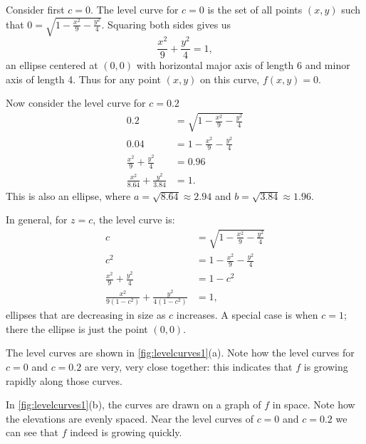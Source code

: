 {Consider first $c=0$. The level curve for $c=0$ is the set of all points $(x,y)$ such that $0=\sqrt{1-\frac{x^2}9-\frac{y^2}4}$. Squaring both sides  gives us
$$\frac{x^2}9+\frac{y^2}4=1,$$ an ellipse centered at $(0,0)$ with horizontal major axis of length 6 and minor axis of length 4. Thus for any point $(x,y)$ on this curve, $f(x,y) = 0$.

Now consider the level curve for $c=0.2$
\begin{align*}
0.2 &= \sqrt{1-\frac{x^2}9-\frac{y^2}4}\\
0.04 &= 1-\frac{x^2}9-\frac{y^2}4\\
\frac{x^2}9+\frac{y^2}4 &=0.96\\
\frac{x^2}{8.64}+\frac{y^2}{3.84} &=1.
\end{align*}
This is also an ellipse, where $a = \sqrt{8.64}\approx 2.94$ and $b=\sqrt{3.84}\approx 1.96$.

In general, for $z=c$, the level curve is:
\begin{align*}
c &= \sqrt{1-\frac{x^2}9-\frac{y^2}4}\\
c^2 &= 1-\frac{x^2}9-\frac{y^2}4\\
\frac{x^2}9+\frac{y^2}4 &=1-c^2\\
\frac{x^2}{9(1-c^2)}+\frac{y^2}{4(1-c^2)} &=1,
\end{align*}
ellipses that are decreasing in size as $c$ increases. A special case is when $c=1$; there the ellipse is just the point $(0,0)$. 


The level curves are shown in \autoref{fig:levelcurves1}(a). Note how the level curves for $c=0$ and $c=0.2$ are very, very close together: this indicates that $f$ is growing rapidly along those curves.

In \autoref{fig:levelcurves1}(b), the curves are drawn on a graph of $f$ in space. Note how the elevations are evenly spaced. Near the level curves of $c=0$ and $c=0.2$ we can see that $f$ indeed is growing quickly.}

